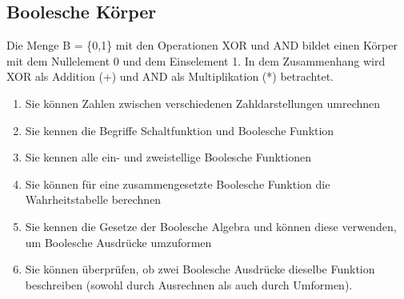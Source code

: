 \documentclass[../main.tex]{subfiles}
\begin{document}
\subsection{Boolesche Körper}
Die Menge B = \{0,1\} mit den Operationen XOR und AND bildet
einen Körper mit dem Nullelement 0 und dem Einselement 1.
In dem Zusammenhang wird XOR als Addition (+) und AND als
Multiplikation (*) betrachtet.
\newline
\begin{goals}
\begin{enumerate}
    \item Sie können Zahlen zwischen verschiedenen Zahldarstellungen umrechnen
    \item Sie kennen die Begriffe Schaltfunktion und Boolesche Funktion
    \item Sie kennen alle ein- und zweistellige Boolesche Funktionen
    \item Sie können für eine zusammengesetzte Boolesche Funktion die
    Wahrheitstabelle berechnen
    \item Sie kennen die Gesetze der Boolesche Algebra und können diese
    verwenden, um Boolesche Ausdrücke umzuformen
    \item Sie können überprüfen, ob zwei Boolesche Ausdrücke dieselbe Funktion
    beschreiben (sowohl durch Ausrechnen als auch durch Umformen).
    
\end{enumerate}
\end{goals}
\end{document}
